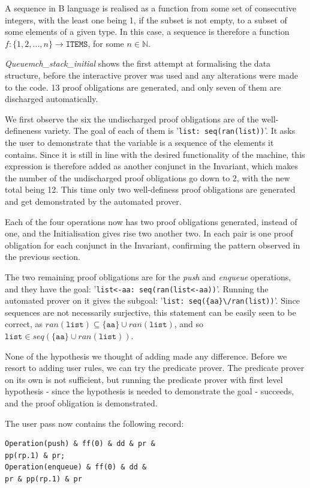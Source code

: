 \documentclass[12pt,journal,duplex]{IEEEtran}
\begin{document}
	A sequence in B language is realised as a function from some set of consecutive integers, with the least one being 1, if the subset is not empty, to a subset of some elements of a given type. In this case, a sequence is therefore a function $f:\{1,2,...,n\} \rightarrow \texttt{ITEMS}$, for some $n \in \mathbb{N}$.

	\emph{Queuemch\_stack\_initial} shows the first attempt at formalising the data structure, before the interactive prover was used and any alterations were made to the code. 13 proof obligations are generated, and only seven of them are discharged automatically.

	We first observe the six the undischarged proof obligations are of the well-defineness variety. The goal of each of them is '\texttt{list: seq(ran(list))}'. It asks the user to demonstrate that the variable is a sequence of the elements it contains. Since it is still in line with the desired functionality of the machine, this expression is therefore added as another conjunct in the Invariant, which makes the number of the undischarged proof obligations go down to 2, with the new total being 12. This time only two well-definess proof obligations are generated and get demonstrated by the automated prover.

	Each of the four operations now has two proof obligations generated, instead of one, and the Initialisation gives rise two another two. In each pair is one proof obligation for each conjunct in the Invariant, confirming the pattern observed in the previous section.

	The two remaining proof obligations are for the \textit{push} and \textit{enqueue} operations, and they have the goal: '\texttt{list<-aa: seq(ran(list<-aa))}'. Running the automated prover on it gives the subgoal: '\verb|list: seq({aa}\/ran(list))|'. Since sequences are not necessarily surjective, this statement can be easily seen to be correct, as $ran(\texttt{list}) \subseteq \{\texttt{aa}\} \cup ran(\texttt{list})$, and so $\texttt{list} \in seq(\{\texttt{aa}\} \cup ran(\texttt{list}))$.

	None of the hypothesis we thought of adding made any difference. Before we resort to adding user rules, we can try the predicate prover. The predicate prover on its own is not sufficient, but running the predicate prover with first level hypothesis - since the hypothesis is needed to demonstrate the goal - succeeds, and the proof obligation is demonstrated.

	The user pass now contains the following record:
	\begin{lstlisting}
Operation(push) & ff(0) & dd & pr &
pp(rp.1) & pr;
Operation(enqueue) & ff(0) & dd &
pr & pp(rp.1) & pr
	\end{lstlisting}
\end{document}
